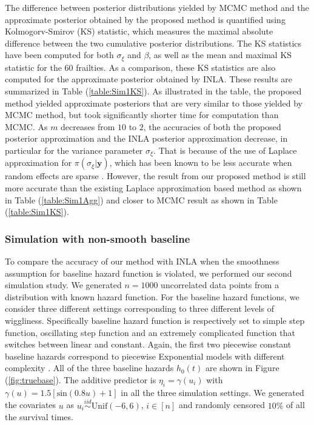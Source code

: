\documentclass[ba]{imsart}
\begin{document}
The difference between posterior distributions yielded by MCMC method and the approximate posterior obtained by the proposed method is quantified using Kolmogorv-Smirov (KS) statistic, which measures the maximal absolute difference between the two cumulative posterior distributions. The KS statistics have been computed for both $\sigma_\xi$ and $\beta$, as well as the mean and maximal KS statistic for the $60$ frailties. As a comparison, these KS statistics are also computed for the approximate posterior obtained by INLA. These results are summarized in Table (\ref{table:Sim1KS}).  As illustrated in the table, the proposed method yielded approximate posteriors that are very similar to those yielded by MCMC method, but took significantly shorter time for computation than MCMC. As $m$ decreases from $10$ to $2$, the accuracies of both the proposed posterior approximation and the INLA posterior approximation decrease, in particular for the variance parameter $\sigma_\xi$. That is because of the use of Laplace approximation for $\pi(\sigma_\xi|\boldsymbol{y})$, which has been known to be less accurate when random effects are sparse \citep{Ogden2013ASR}. However, the result from our proposed method is still more accurate than the existing Laplace approximation based method as shown in Table (\ref{table:Sim1Agg}) and closer to MCMC result as shown in Table (\ref{table:Sim1KS}).



\subsubsection{Simulation with non-smooth baseline}\label{subsubsec:sim2}

To compare the accuracy of our method with INLA when the smoothness assumption for baseline hazard function is violated, we performed our second simulation study. We generated $n = 1000$ uncorrelated data points from a distribution with known hazard function. For the baseline hazard functions, we consider three different settings corresponding to three different levels of wiggliness. Specifically baseline hazard function is respectively set to simple step function, oscillating step function and an extremely complicated function that switches between linear and constant. Again, the first two piecewise constant baseline hazards correspond to piecewise Exponential models with different complexity \citep{piecewiseExp}. All of the three baseline hazards $h_{0}(t)$ are shown in Figure (\ref{fig:truebase}). The additive predictor is $\eta_{i} = \gamma\left(u_{i}\right)$ with $\gamma(u) = 1.5 [ \text{sin}(0.8u) + 1 ]$ in all the three simulation settings. We generated the covariates $u$ as  $u_{i}\overset{iid}{\sim}\text{Unif}(-6,6)$, $i \in [n]$ and randomly censored $10\%$ of all the survival times.
\end{document}
